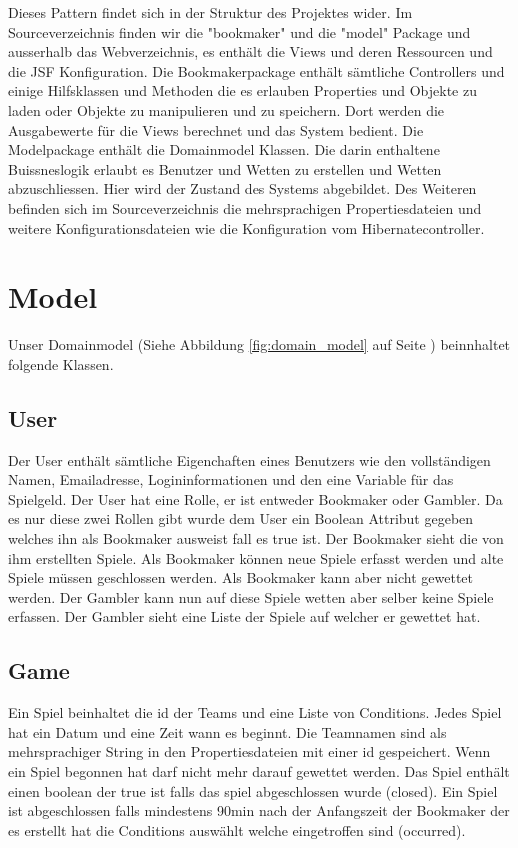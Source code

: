 \documentclass[a4paper, abstracton]{scrartcl}
\begin{document}
  Dieses Pattern findet sich in der Struktur des Projektes wider.
  Im Sourceverzeichnis finden wir die "bookmaker" und die "model" Package und
  ausserhalb das Webverzeichnis, es enthält die Views und deren Ressourcen
  und die JSF Konfiguration.
  Die Bookmakerpackage enthält sämtliche Controllers und einige Hilfsklassen und
  Methoden die es erlauben Properties und Objekte zu laden oder Objekte zu
  manipulieren und zu speichern.
  Dort werden die Ausgabewerte für die Views berechnet und das System bedient.
  Die Modelpackage enthält die Domainmodel Klassen. Die darin enthaltene
  Buissneslogik erlaubt es Benutzer und Wetten zu erstellen und Wetten
  abzuschliessen. Hier wird der Zustand des Systems abgebildet.
  Des Weiteren befinden sich im Sourceverzeichnis die mehrsprachigen Propertiesdateien und weitere Konfigurationsdateien wie die Konfiguration vom Hibernatecontroller.
  
\pagebreak

\section{Model}
 
  Unser Domainmodel
  (Siehe Abbildung \ref{fig:domain_model} auf Seite \pageref{fig:domain_model})
  beinnhaltet folgende Klassen.
  
  \subsection{User}
    Der User enthält sämtliche Eigenchaften eines Benutzers wie
    den vollständigen Namen, Emailadresse, Logininformationen und den eine Variable für das Spielgeld. Der User hat eine Rolle, er ist entweder
    Bookmaker oder Gambler. Da es nur diese zwei Rollen gibt wurde dem User
    ein Boolean Attribut gegeben welches ihn als Bookmaker ausweist fall es
    true ist. Der Bookmaker sieht die von ihm erstellten Spiele.
    Als Bookmaker können neue Spiele erfasst werden und alte Spiele müssen
    geschlossen werden. Als Bookmaker kann aber nicht gewettet werden.
    Der Gambler kann nun auf diese Spiele wetten aber selber keine Spiele
    erfassen. Der Gambler sieht eine Liste der Spiele auf welcher er gewettet hat.
      
  \subsection{Game}
    Ein Spiel beinhaltet die id der Teams und eine Liste von Conditions.
    Jedes Spiel hat ein Datum und eine Zeit wann es beginnt.
    Die Teamnamen sind als mehrsprachiger String in den Propertiesdateien mit einer
    id gespeichert.
    Wenn ein Spiel begonnen hat darf nicht mehr darauf gewettet werden.
    Das Spiel enthält einen boolean der true ist falls das spiel abgeschlossen
    wurde (closed). Ein Spiel ist abgeschlossen falls mindestens 90min nach
    der Anfangszeit der Bookmaker der es erstellt hat die Conditions
    auswählt welche eingetroffen sind (occurred).
      
\end{document}
